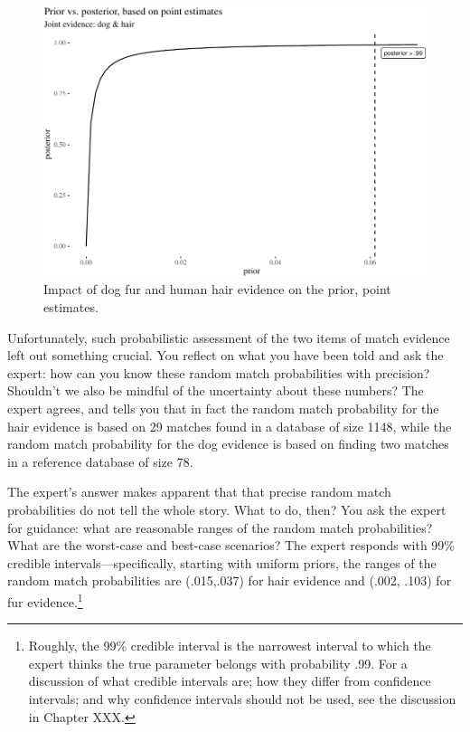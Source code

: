 \documentclass[
  10pt,
  dvipsnames,enabledeprecatedfontcommands]{scrartcl}
\begin{document}
\begin{figure}[H]

\begin{center}\includegraphics[width=0.8\linewidth]{chapter-outline_files/figure-latex/impactOfPoint4-1} \end{center}
\caption{Impact of dog fur and human hair evidence on the prior, point estimates.}
\label{fig:impactOfPoint}
\end{figure}

Unfortunately, such probabilistic assessment of the two items of match
evidence left out something crucial. You reflect on what you have been
told and ask the expert: how can you know these random match
probabilities with precision? Shouldn't we also be mindful of the
uncertainty about these numbers? The expert agrees, and tells you that
in fact the random match probability for the hair evidence is based on
29 matches found in a database of size 1148, while the random match
probability for the dog evidence is based on finding two matches in a
reference database of size 78.

The expert's answer makes apparent that that precise random match
probabilities do not tell the whole story. What to do, then? You ask the
expert for guidance: what are reasonable ranges of the random match
probabilities? What are the worst-case and best-case scenarios? The
expert responds with 99\% credible intervals---specifically, starting
with uniform priors, the ranges of the random match probabilities are
(.015,.037) for hair evidence and (.002, .103) for fur
evidence.\footnote{Roughly, the 99\% credible interval is the narrowest
  interval to which the expert thinks the true parameter belongs with
  probability .99. For a discussion of what credible intervals are; how
  they differ from confidence intervals; and why confidence intervals
  should not be used, see the discussion in Chapter XXX.}
\end{document}
